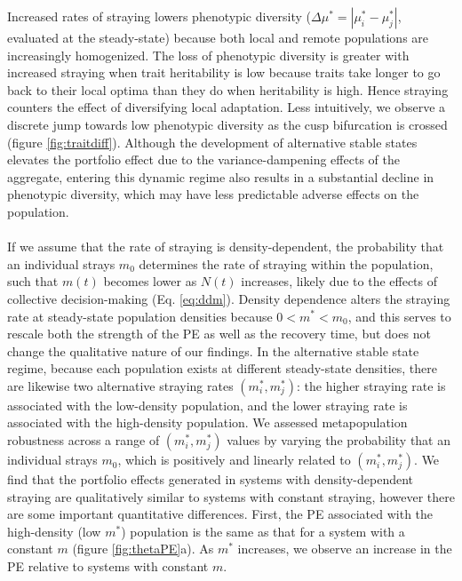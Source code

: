 \documentclass{revtex4}
\begin{document}
Increased rates of straying lowers phenotypic diversity ($\Delta \mu^* = |\mu_i^*-\mu_j^*|$, evaluated at the steady-state) because both local and remote populations are increasingly homogenized.
The loss of phenotypic diversity is greater with increased straying when trait heritability is low because traits take longer to go back to their local optima than they do when heritability is high. 
Hence straying counters the effect of diversifying local adaptation. 
Less intuitively, we observe a discrete jump towards low phenotypic diversity as the cusp bifurcation is crossed (figure \ref{fig:traitdiff}).
Although the development of alternative stable states elevates the portfolio effect due to the variance-dampening effects of the aggregate, entering this dynamic regime also results in a substantial decline in phenotypic diversity, which may have less predictable adverse effects on the population.\\


 \\
If we assume that the rate of straying is density-dependent, the probability that an individual strays $m_0$ determines the rate of straying within the population, such that $m(t)$ becomes lower as $N(t)$ increases, likely due to the effects of collective decision-making \citep{Berdahl:2016dx} (Eq. \ref{eq:ddm}).
Density dependence alters the straying rate at steady-state population densities because $0 < m^* < m_0$, and this serves to rescale both the strength of the PE as well as the recovery time, but does not change the qualitative nature of our findings.
In the alternative stable state regime, because each population exists at different steady-state densities, there are likewise two alternative straying rates $(m_i^*,m_j^*)$: the higher straying rate is associated with the low-density population, and the lower straying rate is associated with the high-density population.
We assessed metapopulation robustness across a range of $(m_i^*,m_j^*)$ values by varying the probability that an individual strays $m_0$, which is positively and linearly related to $(m_i^*,m_j^*)$.
We find that the portfolio effects generated in systems with density-dependent straying are qualitatively similar to systems with constant straying, however there are some important quantitative differences.
First, the PE associated with the high-density (low $m^*$) population is the same as that for a system with a constant $m$ (figure \ref{fig:thetaPE}a).
As $m^*$ increases, we observe an increase in the PE relative to systems with constant $m$.
\end{document}
